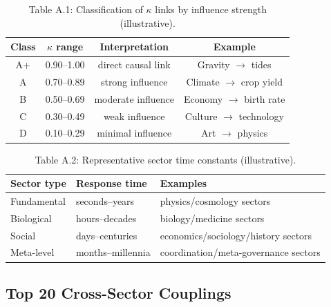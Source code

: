 \documentclass[13pt,a4paper]{article}
\begin{document}
	\begin{table}[htbp]
		\centering
		\small
		\begin{tabular}{cccc}
			\toprule
			\textbf{Class} & \textbf{$\kappa$ range} & \textbf{Interpretation} & \textbf{Example} \\
			\midrule
			A+ & 0.90--1.00 & direct causal link & Gravity $\rightarrow$ tides \\
			A  & 0.70--0.89 & strong influence & Climate $\rightarrow$ crop yield \\
			B  & 0.50--0.69 & moderate influence & Economy $\rightarrow$ birth rate \\
			C  & 0.30--0.49 & weak influence & Culture $\rightarrow$ technology \\
			D  & 0.10--0.29 & minimal influence & Art $\rightarrow$ physics \\
			\bottomrule
		\end{tabular}
		\caption{Table A.1: Classification of $\kappa$ links by influence strength (illustrative).}
	\end{table}
	
	\begin{table}[htbp]
		\centering
		\small
		\begin{tabular}{p{}p{}p{}}
			\toprule
			\textbf{Sector type} & \textbf{Response time} & \textbf{Examples} \\
			\midrule
			Fundamental & seconds--years & physics/cosmology sectors \\
			Biological  & hours--decades & biology/medicine sectors \\
			Social      & days--centuries & economics/sociology/history sectors \\
			Meta-level  & months--millennia & coordination/meta-governance sectors \\
			\bottomrule
		\end{tabular}
		\caption{Table A.2: Representative sector time constants (illustrative).}
	\end{table}
	
	\subsection*{Top 20 Cross-Sector Couplings}
	
\end{document}
